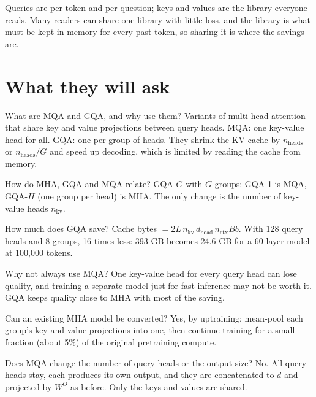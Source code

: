 \begin{intuition}
Queries are per token and per question; keys and values are the library everyone reads. Many readers can share one library with little loss, and the library is what must be kept in memory for every past token, so sharing it is where the savings are.
\end{intuition}

\section{What they will ask}

\begin{iq}[\core]{What are MQA and GQA, and why use them?}
Variants of multi-head attention that share key and value projections between query heads. MQA: one key-value head for all. GQA: one per group of heads. They shrink the KV cache by $n_{\text{heads}}$ or $n_{\text{heads}}/G$ and speed up decoding, which is limited by reading the cache from memory.
\end{iq}

\begin{iq}[\core]{How do MHA, GQA and MQA relate?}
GQA-$G$ with $G$ groups: GQA-1 is MQA, GQA-$H$ (one group per head) is MHA. The only change is the number of key-value heads $n_{\text{kv}}$.
\end{iq}

\begin{iq}[\core]{How much does GQA save?}
Cache bytes $= 2 L\, n_{\text{kv}}\, d_{\text{head}}\, n_{\text{ctx}} B b$. With 128 query heads and 8 groups, 16 times less: 393 GB becomes 24.6 GB for a 60-layer model at 100,000 tokens.
\end{iq}

\begin{iq}{Why not always use MQA?}
One key-value head for every query head can lose quality, and training a separate model just for fast inference may not be worth it. GQA keeps quality close to MHA with most of the saving.
\end{iq}

\begin{iq}{Can an existing MHA model be converted?}
Yes, by uptraining: mean-pool each group's key and value projections into one, then continue training for a small fraction (about 5\%) of the original pretraining compute.
\end{iq}

\begin{iq}{Does MQA change the number of query heads or the output size?}
No. All query heads stay, each produces its own output, and they are concatenated to $d$ and projected by $W^O$ as before. Only the keys and values are shared.
\end{iq}
